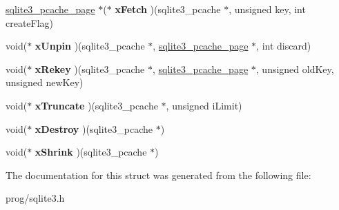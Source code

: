 \begin{DoxyCompactItemize}
\mbox{\hyperlink{structsqlite3__pcache__page}{sqlite3\+\_\+pcache\+\_\+page}} $\ast$($\ast$ {\bfseries x\+Fetch} )(sqlite3\+\_\+pcache $\ast$, unsigned key, int create\+Flag)
\item 
\mbox{\label{structsqlite3__pcache__methods2_a8fcb4ba48106aac8dfff247baea06e1a}} 
void($\ast$ {\bfseries x\+Unpin} )(sqlite3\+\_\+pcache $\ast$, \mbox{\hyperlink{structsqlite3__pcache__page}{sqlite3\+\_\+pcache\+\_\+page}} $\ast$, int discard)
\item 
\mbox{\label{structsqlite3__pcache__methods2_ad5b7609bdc0d2ae80325f7925b76c0af}} 
void($\ast$ {\bfseries x\+Rekey} )(sqlite3\+\_\+pcache $\ast$, \mbox{\hyperlink{structsqlite3__pcache__page}{sqlite3\+\_\+pcache\+\_\+page}} $\ast$, unsigned old\+Key, unsigned new\+Key)
\item 
\mbox{\label{structsqlite3__pcache__methods2_a711d60b1895622a10186a2894cef1383}} 
void($\ast$ {\bfseries x\+Truncate} )(sqlite3\+\_\+pcache $\ast$, unsigned i\+Limit)
\item 
\mbox{\label{structsqlite3__pcache__methods2_a17a43db31d015c29e44d68c752682365}} 
void($\ast$ {\bfseries x\+Destroy} )(sqlite3\+\_\+pcache $\ast$)
\item 
\mbox{\label{structsqlite3__pcache__methods2_a225971a193ff429d9f1339aca39c7755}} 
void($\ast$ {\bfseries x\+Shrink} )(sqlite3\+\_\+pcache $\ast$)
\end{DoxyCompactItemize}


The documentation for this struct was generated from the following file\+:\begin{DoxyCompactItemize}
\item 
prog/sqlite3.\+h\end{DoxyCompactItemize}
